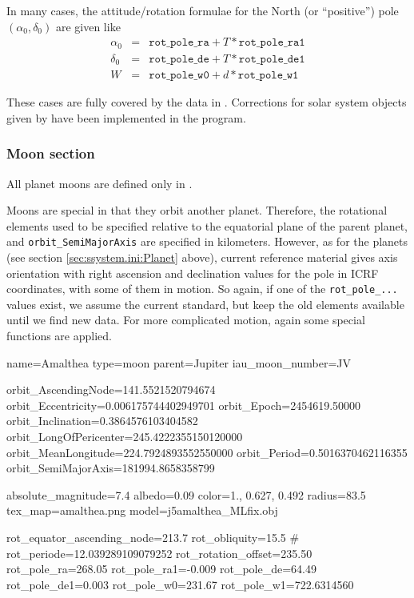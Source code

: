 \noindent In many cases, the attitude/rotation formulae for the North (or
``positive'') pole $(\alpha_0, \delta_0)$ are given like
\begin{eqnarray}
  \label{eq:PlanetOrientation}
  \alpha_0 &=& \mathtt{rot\_pole\_ra} + T * \mathtt{rot\_pole\_ra1}\\
  \delta_0 &=& \mathtt{rot\_pole\_de} + T * \mathtt{rot\_pole\_de1}\\
  W        &=& \mathtt{rot\_pole\_w0} + d * \mathtt{rot\_pole\_w1}
\end{eqnarray}

\noindent These cases are fully covered by the data in
. Corrections for solar system objects given
by \citet{ESAA:2013, WGCCRE2009, WGCCRE2009:corr, WGCCRE2015,
  WGCCRE2015:corr} have been implemented in the program.


\subsubsection{Moon section}
\label{sec:ssystem.ini:Moon}

All planet moons are defined only in .

Moons are special in that they orbit another planet. Therefore, the
rotational elements used to be specified relative to the equatorial
plane of the parent planet, and \texttt{orbit\_SemiMajorAxis} are
specified in kilometers.  However,  as for the
planets (see section \ref{sec:ssystem.ini:Planet} above), current
 reference material gives axis orientation with right
ascension and declination values for the pole in ICRF coordinates,
with some of them in motion. So again, if one of the
\texttt{rot\_pole\_...} values exist, we assume the current
standard, but keep the old elements available until we find new data.
For more complicated motion, again some special functions
are applied.

\newpage
\begin{configfile}
[amalthea]
name=Amalthea
type=moon
parent=Jupiter
iau_moon_number=JV

orbit_AscendingNode=141.5521520794674
orbit_Eccentricity=0.006175744402949701
orbit_Epoch=2454619.50000
orbit_Inclination=0.3864576103404582
orbit_LongOfPericenter=245.4222355150120000
orbit_MeanLongitude=224.7924893552550000
orbit_Period=0.5016370462116355
orbit_SemiMajorAxis=181994.8658358799

absolute_magnitude=7.4
albedo=0.09
color=1., 0.627, 0.492
radius=83.5
tex_map=amalthea.png
model=j5amalthea_MLfix.obj


rot_equator_ascending_node=213.7
rot_obliquity=15.5
# rot_periode=12.039289109079252
rot_rotation_offset=235.50
rot_pole_ra=268.05
rot_pole_ra1=-0.009
rot_pole_de=64.49
rot_pole_de1=0.003
rot_pole_w0=231.67
rot_pole_w1=722.6314560
\end{configfile}

